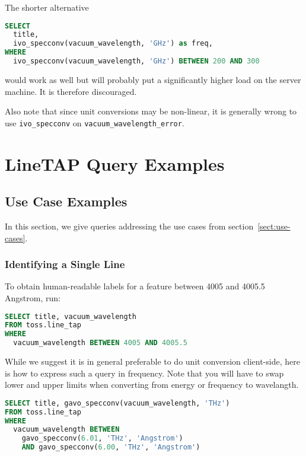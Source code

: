 \documentclass[11pt,a4paper]{ivoa}
\begin{document}
The shorter alternative

\begin{lstlisting}[language=SQL]
SELECT 
  title,
  ivo_specconv(vacuum_wavelength, 'GHz') as freq,
WHERE
  ivo_specconv(vacuum_wavelength, 'GHz') BETWEEN 200 AND 300
\end{lstlisting}

would work as well but will probably put a significantly higher load on
the server machine.  It is therefore discouraged.

Also note that since unit conversions may be non-linear, it is generally
wrong to use \texttt{ivo\_specconv} on
\texttt{vacuum\_wavelength\_error}.


\section{LineTAP Query Examples}

\subsection{Use Case Examples}

In this section, we give queries addressing the use cases from
section~\ref{sect:use-cases}.

\subsubsection{Identifying a Single Line}

To obtain human-readable labels for a feature between 4005 and 4005.5
Angstrom, run:

\begin{lstlisting}[language=SQL]
SELECT title, vacuum_wavelength
FROM toss.line_tap
WHERE
  vacuum_wavelength BETWEEN 4005 AND 4005.5
\end{lstlisting}

While we suggest it is in general preferable to do unit conversion
client-side, here is how to express such a query in
frequency.
Note that you will have to swap lower and upper limits when converting
from energy or frequency to wavelangth.

\begin{lstlisting}[language=SQL]
SELECT title, gavo_specconv(vacuum_wavelength, 'THz')
FROM toss.line_tap
WHERE
  vacuum_wavelength BETWEEN 
    gavo_specconv(6.01, 'THz', 'Angstrom')
    AND gavo_specconv(6.00, 'THz', 'Angstrom')
\end{lstlisting}
\end{document}
